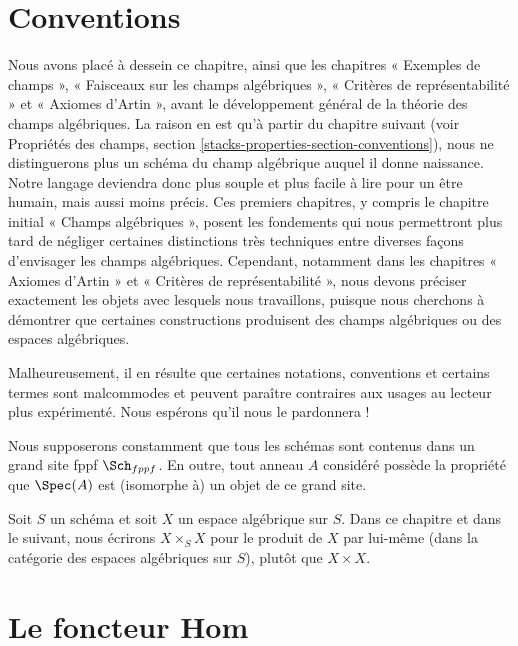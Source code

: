 \section{Conventions}
\label{section-conventions}

\noindent
Nous avons placé à dessein ce chapitre, ainsi que les chapitres « Exemples de
champs », « Faisceaux sur les champs algébriques », « Critères de
représentabilité » et « Axiomes d'Artin », avant le développement général de
la théorie des champs algébriques. La raison en est qu'à partir du chapitre
suivant (voir Propriétés des champs, section
\ref{stacks-properties-section-conventions}), nous ne distinguerons plus un
schéma du champ algébrique auquel il donne naissance. Notre langage deviendra
donc plus souple et plus facile à lire pour un être humain, mais aussi moins
précis. Ces premiers chapitres, y compris le chapitre initial « Champs
algébriques », posent les fondements qui nous permettront plus tard de négliger
certaines distinctions très techniques entre diverses façons d'envisager les
champs algébriques. Cependant, notamment dans les chapitres « Axiomes d'Artin »
et « Critères de représentabilité », nous devons préciser exactement les objets
avec lesquels nous travaillons, puisque nous cherchons à démontrer que
certaines constructions produisent des champs algébriques ou des espaces
algébriques.

\medskip\noindent
Malheureusement, il en résulte que certaines notations, conventions et certains
termes sont malcommodes et peuvent paraître contraires aux usages au lecteur
plus expérimenté. Nous espérons qu'il nous le pardonnera !

\medskip\noindent
Nous supposerons constamment que tous les schémas sont contenus dans un grand
site fppf $\Sch_{fppf}$. En outre, tout anneau $A$ considéré possède la
propriété que $\Spec(A)$ est (isomorphe à) un objet de ce grand site.

\medskip\noindent
Soit $S$ un schéma et soit $X$ un espace algébrique sur $S$. Dans ce chapitre
et dans le suivant, nous écrirons $X \times_S X$ pour le produit de $X$ par
lui-même (dans la catégorie des espaces algébriques sur $S$), plutôt que
$X \times X$.














\section{Le foncteur Hom}
\label{section-hom}

